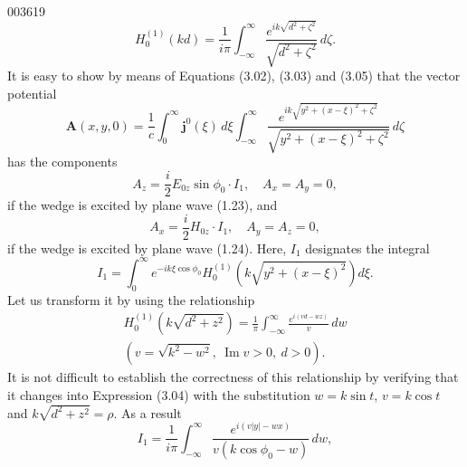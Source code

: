\begin{scanpage}{0036}{19}
\[H_0^{(1)}(kd)=\frac1{i\pi}\int_{-\infty}^{\infty}\frac{e^{ik\sqrt{d^2+\zeta^2}}}{\sqrt{d^2+\zeta^2}}\,d\zeta.\tag{3.05}\]
It is easy to show by means of Equations (3.02), (3.03) and (3.05) that the vector potential
\[\mathbf A(x,y,0)=\frac1c\int_0^\infty\mathbf j^0(\xi)\,d\xi\int_{-\infty}^{\infty}\frac{e^{ik\sqrt{y^2+(x-\xi)^2+\zeta^2}}}{\sqrt{y^2+(x-\xi)^2+\zeta^2}}\,d\zeta\tag{3.06}\]
has the components
\[A_z=\frac i2E_{0z}\sin\phi_0\cdot I_1,\quad A_x=A_y=0,\tag{3.07}\]
if the wedge is excited by plane wave (1.23), and
\[A_x=\frac i2H_{0z}\cdot I_1,\quad A_y=A_z=0,\tag{3.08}\]
if the wedge is excited by plane wave (1.24). Here, $I_1$ designates the integral
\[I_1=\int_0^\infty e^{-ik\xi\cos\phi_0}H_0^{(1)}\left(k\sqrt{y^2+(x-\xi)^2}\right)d\xi.\tag{3.09}\]
Let us transform it by using the relationship
\[\begin{gathered}H_0^{(1)}\left(k\sqrt{d^2+z^2}\right)=\frac1\pi\int_{-\infty}^{\infty}\frac{e^{i(vd-wz)}}v\,dw\\(v=\sqrt{k^2-w^2},\ \operatorname{Im}v>0,\ d>0).\end{gathered}\tag{3.10}\]
It is not difficult to establish the correctness of this relationship by verifying that it changes into Expression (3.04) with the substitution $w=k\sin t$, $v=k\cos t$ and $k\sqrt{d^2+z^2}=\rho$. As a result
\[I_1=\frac1{i\pi}\int_{-\infty}^{\infty}\frac{e^{i(v|y|-wx)}}{v(k\cos\phi_0-w)}\,dw,\tag{3.11}\]
\end{scanpage}
